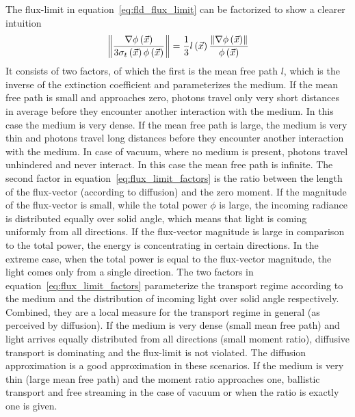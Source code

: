 The flux-limit in equation~\ref{eq:fld_flux_limit} can be factorized to show a clearer intuition
\begin{align}
\label{eq:flux_limit_factors}
\left\lVert
\frac{\nabla\phi\left(\vec{x}\right)}{3\sigma_t\left(\vec{x}\right)\phi\left(\vec{x}\right)}
\right\rVert
=
\frac{1}{3}
l\left(\vec{x}\right)
\frac{\left\lVert\nabla\phi\left(\vec{x}\right)\right\rVert}{\phi\left(\vec{x}\right)}
\end{align}
It consists of two factors, of which the first is the mean free path $l$, which is the inverse of the extinction coefficient and parameterizes the medium. If the mean free path is small and approaches zero, photons travel only very short distances in average before they encounter another interaction with the medium. In this case the medium is very dense. If the mean free path is large, the medium is very thin and photons travel long distances before they encounter another interaction with the medium. In case of vacuum, where no medium is present, photons travel unhindered and never interact. In this case the mean free path is infinite.
The second factor in equation~\ref{eq:flux_limit_factors} is the ratio between the length of the flux-vector (according to diffusion) and the zero moment. If the magnitude of the flux-vector is small, while the total power $\phi$ is large, the incoming radiance is distributed equally over solid angle, which means that light is coming uniformly from all directions. If the flux-vector magnitude is large in comparison to the total power, the energy is concentrating in certain directions. In the extreme case, when the total power is equal to the flux-vector magnitude, the light comes only from a single direction.
The two factors in equation~\ref{eq:flux_limit_factors} parameterize the transport regime according to the medium and the distribution of incoming light over solid angle respectively. Combined, they are a local measure for the transport regime in general (as perceived by diffusion). If the medium is very dense (small mean free path) and light arrives equally distributed from all directions (small moment ratio), diffusive transport is dominating and the flux-limit is not violated. The diffusion approximation is a good approximation in these scenarios. If the medium is very thin (large mean free path) and the moment ratio approaches one, ballistic transport and free streaming in the case of vacuum or when the ratio is exactly one is given.

